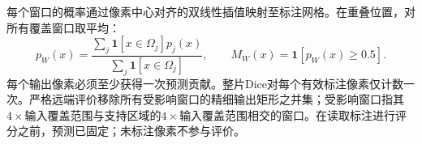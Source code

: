 每个窗口的概率通过像素中心对齐的双线性插值映射至标注网格。在重叠位置，对所有覆盖窗口取平均：
\begin{equation}
 p_W(x)=\frac{\sum_j\mathbf{1}[x\in\Omega_j]p_j(x)}
                   {\sum_j\mathbf{1}[x\in\Omega_j]},\qquad
 M_W(x)=\mathbf{1}[p_W(x)\geq0.5].
\end{equation}
每个输出像素必须至少获得一次预测贡献。整片Dice对每个有效标注像素仅计数一次。严格远端评价移除所有受影响窗口的精细输出矩形之并集；受影响窗口指其$4\times$输入覆盖范围与支持区域的$4\times$输入覆盖范围相交的窗口。在读取标注进行评分之前，预测已固定；未标注像素不参与评价。
